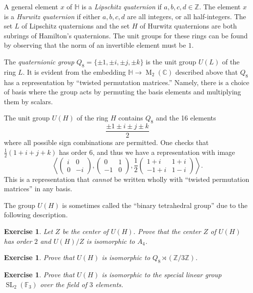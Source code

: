 \documentclass[12pt]{article}
\theoremstyle{plain}
\newtheorem{exercise}[theorem]{Exercise}
\theoremstyle{definition}
\theoremstyle{remark}
\numberwithin{equation}{section}
\begin{document}
A general element $x$ of $\mathbb{H}$
is a \emph{Lipschitz quaternion} if
$a,b,c,d \in \mathbb{Z}$.
The element $x$ is a \emph{Hurwitz quaternion}
if either $a,b,c,d$ are all integers, or all half-integers.
The set $L$ of Lipschitz quaternions and the set $H$ of Hurwitz
quaternions are both subrings of Hamilton's quaternions.
The unit groups for these rings can be found by observing that the norm of
an invertible element must be $1$.

The \emph{quaternionic group} $Q_8 = \{\pm 1, \pm i, \pm j, \pm k\}$ is
the unit group $U(L)$ of the ring $L$.
It is evident from the embedding
$\mathbb{H} \to \operatorname{M}_2(\mathbb{C})$ described above
that $Q_8$ has a representation by ``twisted permutation
matrices.''
Namely, there is a choice of basis where the group acts by permuting
the basis elements and multiplying them by scalars.

The unit group $U(H)$ of the ring $H$ contains $Q_8$ and the 16 elements
\[
\frac{ \pm 1 \pm i \pm j \pm k }{2}
\]
where all possible sign combinations are permitted.
One checks that $\frac{1}{2}(1+i+j+k)$ has order $6$, and thus we have a
representation with image
\[
\left\langle \begin{pmatrix} i&0\\0&-i \end{pmatrix},
\begin{pmatrix} 0&1\\-1&0 \end{pmatrix},
\frac{1}{2} \begin{pmatrix} 1+i&1+i\\-1+i&1-i \end{pmatrix}\right\rangle
.
\]
This is a representation that \emph{cannot} be written wholly with
``twisted permutation matrices'' in any basis.

The group $U(H)$ is sometimes called the ``binary tetrahedral group''
due to the following description.

\begin{exercise}
Let $Z$ be the center of $U(H)$.
Prove that the center $Z$ of $U(H)$ has order $2$ and
$U(H)/Z $ is isomorphic to $A_4$.
\end{exercise}

\begin{exercise}
Prove that $U(H)$ is isomorphic to $Q_8 \rtimes (\mathbb{Z}/3\mathbb{Z})$.
\end{exercise}

\begin{exercise}
Prove that $U(H)$ is isomorphic to the special linear group
$\operatorname{SL}_2(\mathbb{F}_3)$ over the field of $3$ elements.
\end{exercise}




\end{document}
